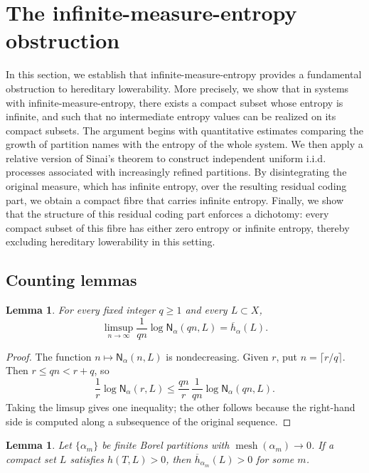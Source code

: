 \documentclass[12pt,letterpaper,reqno]{amsart}
\newcommand{\mesh}{\operatorname{mesh}}
\newcommand{\Nname}{\mathsf N}
\newtheorem{lemma}[theorem]{Lemma}
\theoremstyle{definition}
\theoremstyle{remark}
\numberwithin{equation}{section}
\begin{document}
	\section{The infinite-measure-entropy obstruction}
	\label{sec:infinite-obstruction}
    In this section, we establish that infinite-measure-entropy provides a fundamental obstruction to hereditary lowerability. More precisely, we show that in systems with infinite-measure-entropy, there exists a compact subset whose entropy is infinite, and such that no intermediate entropy values can be realized on its compact subsets. The argument begins with quantitative estimates comparing the growth of partition names with the  entropy of the whole system. We then apply a relative version of Sinai’s theorem to construct independent uniform i.i.d. processes associated with increasingly refined partitions. By disintegrating the original measure, which has infinite entropy, over the resulting residual coding part, we obtain a compact fibre that carries infinite entropy. Finally, we show that the structure of this residual coding part enforces a dichotomy: every compact subset of this fibre has either zero entropy or infinite entropy, thereby excluding hereditary lowerability in this setting.
    
	\subsection{Counting lemmas}
	\label{sec:counting}
	
	\begin{lemma}
		\label{lem:subsequence}
		For every fixed integer $q\geq1$ and every $L\subset X$,
		\[
		\limsup_{n\to\infty}
		\frac1{qn}\log\Nname_\alpha(qn,L)
		=
		\overline h_\alpha(L).
		\]
	\end{lemma}
	
	\begin{proof}
		The function $n\mapsto\Nname_\alpha(n,L)$ is nondecreasing. Given $r$, put
		$n=\lceil r/q\rceil$. Then $r\leq qn<r+q$, so
		\[
		\frac1r\log\Nname_\alpha(r,L)
		\leq
		\frac{qn}{r}\,
		\frac1{qn}\log\Nname_\alpha(qn,L).
		\]
		Taking the limsup gives one inequality; the other follows because the
		right-hand side is computed along a subsequence of the original sequence.
	\end{proof}
	
	\begin{lemma}
		\label{lem:mesh}
		Let $\{\alpha_m\}$ be finite Borel partitions with
		$\mesh(\alpha_m)\to0$. If a compact set $L$ satisfies $h(T,L)>0$, then
		$\overline h_{\alpha_m}(L)>0$ for some $m$.
	\end{lemma}
	
\end{document}
